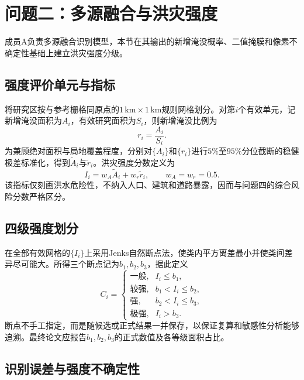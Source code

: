 \section{问题二：多源融合与洪灾强度}

成员A负责多源融合识别模型，本节在其输出的新增淹没概率、二值掩膜和像素不确定性基础上建立洪灾强度分级。

\subsection{强度评价单元与指标}

将研究区按与参考栅格同原点的$1\,\mathrm{km}\times1\,\mathrm{km}$规则网格划分。对第$i$个有效单元，记新增淹没面积为$A_i$，有效研究面积为$S_i$，则新增淹没比例为
\begin{equation}
 r_i=\frac{A_i}{S_i}.
\end{equation}
为兼顾绝对面积与局地覆盖程度，分别对$\{A_i\}$和$\{r_i\}$进行$5\%$至$95\%$分位截断的稳健极差标准化，得到$\widetilde A_i$与$\widetilde r_i$。洪灾强度分数定义为
\begin{equation}
 I_i=w_A\widetilde A_i+w_r\widetilde r_i,\qquad
 w_A=w_r=0.5.
\end{equation}
该指标仅刻画洪水危险性，不纳入人口、建筑和道路暴露，因而与问题四的综合风险分数严格区分。

\subsection{四级强度划分}

在全部有效网格的$\{I_i\}$上采用Jenks自然断点法，使类内平方离差最小并使类间差异尽可能大。所得三个断点记为$b_1,b_2,b_3$，据此定义
\begin{equation}
 C_i=
 \begin{cases}
 \text{一般}, & I_i\le b_1,\\
 \text{较强}, & b_1<I_i\le b_2,\\
 \text{强}, & b_2<I_i\le b_3,\\
 \text{极强}, & I_i>b_3.
 \end{cases}
\end{equation}
断点不手工指定，而是随候选或正式结果一并保存，以保证复算和敏感性分析能够追溯。最终论文应报告$b_1,b_2,b_3$的正式数值及各等级面积占比。

\subsection{识别误差与强度不确定性}

